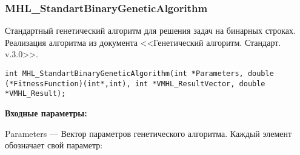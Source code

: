 \documentclass[a4paper,12pt]{article}
\begin{document}
\subsubsection{MHL\_StandartBinaryGeneticAlgorithm}\label{MHL_StandartBinaryGeneticAlgorithm}

Стандартный генетический алгоритм для решения задач на бинарных строках. Реализация алгоритма из документа <<Генетический алгоритм. Стандарт. v.3.0>>.


\begin{lstlisting}[label=code_syntax_MHL_StandartBinaryGeneticAlgorithm,caption=Синтаксис]
int MHL_StandartBinaryGeneticAlgorithm(int *Parameters, double (*FitnessFunction)(int*,int), int *VMHL_ResultVector, double *VMHL_Result);
\end{lstlisting}

\textbf{Входные параметры:}
 
Parameters --- Вектор параметров генетического алгоритма. Каждый элемент обозначает свой параметр:
 
\end{document}
